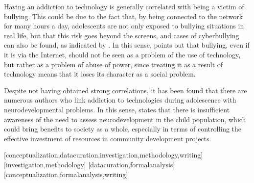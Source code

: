 \documentclass[english]{textolivre}
\begin{document}
Having an addiction to technology is generally correlated with being a victim of bullying. This could be due to the fact that, by being connected to the network for many hours a day, adolescents are not only exposed to bullying situations in real life, but that this risk goes beyond the screens, and cases of cyberbullying can also be found, as indicated by \textcite{perez2021theory}. %
In this sense, \textcite{cortesalfaro2020acoso} %
points out that bullying, even if it is via the Internet, should not be seen as a problem of the use of technology, but rather as a problem of abuse of power, since treating it as a result of technology means that it loses its character as a social problem.

Despite not having obtained strong correlations, it has been found that there are numerous authors who link addiction to technologies during adolescence with neurodevelopmental problems. In this sense, \textcite{alvarez2010neurociencias} %
states that there is insufficient awareness of the need to assess neurodevelopment in the child population, which could bring benefits to society as a whole, especially in terms of controlling the effective investment of resources in community development projects.

\printbibliography\label{sec-bib}


\begin{contributors}
[conceptualization,datacuration,investigation,methodology,writing]
[investigation,methodology]
[datacuration,formalanalysis]
[conceptualization,formalanalysis,writing]
\end{contributors}
\end{document}
